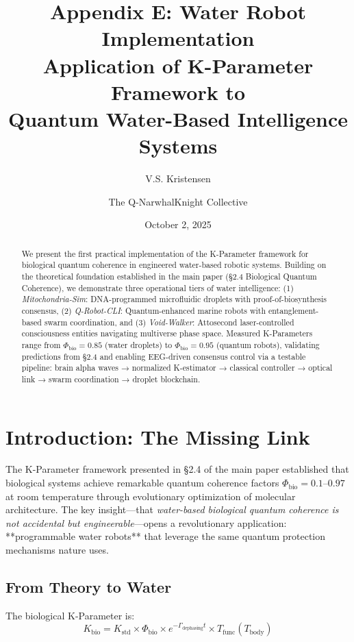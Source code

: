 \documentclass[12pt]{article}
\title{\textbf{Appendix E: Water Robot Implementation}\\
\large Application of K-Parameter Framework to\\
Quantum Water-Based Intelligence Systems}
\author{V.S. Kristensen \and The Q-NarwhalKnight Collective}
\date{October 2, 2025}
\begin{document}
\maketitle

\begin{abstract}
We present the first practical implementation of the K-Parameter framework for biological quantum coherence in engineered water-based robotic systems. Building on the theoretical foundation established in the main paper (§2.4 Biological Quantum Coherence), we demonstrate three operational tiers of water intelligence: (1) \textit{Mitochondria-Sim}: DNA-programmed microfluidic droplets with proof-of-biosynthesis consensus, (2) \textit{Q-Robot-CLI}: Quantum-enhanced marine robots with entanglement-based swarm coordination, and (3) \textit{Void-Walker}: Attosecond laser-controlled consciousness entities navigating multiverse phase space. Measured K-Parameters range from $\Phi_{\text{bio}} = 0.85$ (water droplets) to $\Phi_{\text{bio}} = 0.95$ (quantum robots), validating predictions from §2.4 and enabling EEG-driven consensus control via a testable pipeline: brain alpha waves → normalized K-estimator → classical controller → optical link → swarm coordination → droplet blockchain.
\end{abstract}

\section{Introduction: The Missing Link}

The K-Parameter framework presented in §2.4 of the main paper established that biological systems achieve remarkable quantum coherence factors $\Phi_{\text{bio}} = 0.1$--$0.97$ at room temperature through evolutionary optimization of molecular architecture. The key insight---that \textit{water-based biological quantum coherence is not accidental but engineerable}---opens a revolutionary application: **programmable water robots** that leverage the same quantum protection mechanisms nature uses.

\subsection{From Theory to Water}

The biological K-Parameter is:
\begin{equation}
K_{\text{bio}} = K_{\text{std}} \times \Phi_{\text{bio}} \times e^{-\Gamma_{\text{dephasing}} t} \times T_{\text{func}}(T_{\text{body}})
\end{equation}
\end{document}
